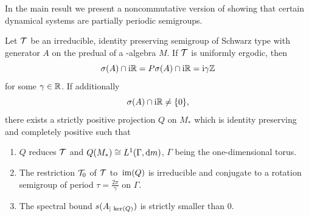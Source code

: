 In the main result we present a noncommutative version of \textcite{nagel:1984} showing that certain dynamical systems are partially periodic semigroups.
\begin{proposition}\label{prop:d4-3.10}
Let $ \mathcal{T} $  be an irreducible, identity preserving semigroup of Schwarz type with generator $ A $  on the predual of a \WA-algebra $ M $.
If\/ $ \mathcal{T} $  is uniformly ergodic, then 
%
\[
	 \sigma(A) \cap \mathrm{i}\mathbb{R} = P\sigma(A) \cap \mathrm{i}\mathbb{R} = \mathrm{i}\gamma\mathbb{Z}  
\]
%
for some $ \gamma \in \mathbb{R} $.
If additionally 
%
\[
	\sigma(A) \cap \mathrm{i}\mathbb{R} \neq \{0\} ,
\]
%
there exists a strictly positive projection $ Q $  on $ M_{*} $  which is identity preserving and completely positive such that
\begin{enumerate}[\upshape (i)]
\item
$ Q $  reduces $ \mathcal{T} $  and $ Q(M_{*}) \cong L^{1}(\Gamma, \mathop{}\!\mathrm{d}{m}) $, $\Gamma$  being the one-dimensional torus.

\item
The restriction $ \mathcal{T}_{0} $  of\/ $ \mathcal{T} $  to $ \mathop{}\mathrm{im}(Q) $  is irreducible and conjugate to a rotation semigroup of period $ \tau = \frac{2\pi}{\gamma} $  on $\Gamma$.

\item
The spectral bound $ s(A_{| \mathop{}\mathrm{ker}(Q) }) $  is strictly smaller than $ 0 $.
\end{enumerate}
\end{proposition}
